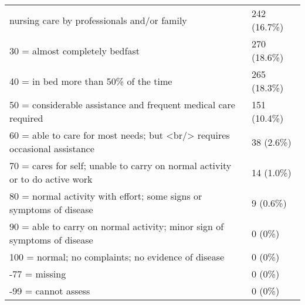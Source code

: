 \begin{tabular}[t]{ll}
\hspace{1em}nursing care by professionals and/or family & 242 (16.7\%)\\
\hspace{1em}30 = almost completely bedfast & 270 (18.6\%)\\
\hspace{1em}40 = in bed more than 50\% of the time & 265 (18.3\%)\\
50 = considerable assistance and 
\hspace{1em}frequent medical care required & 151 (10.4\%)\\
60 = able to care for most needs; but <br/> 
\hspace{1em}requires occasional assistance & 38 (2.6\%)\\
70 = cares for self; unable to carry on 
\hspace{1em}normal activity or to do active work & 14 (1.0\%)\\
80 = normal activity with effort; some 
\hspace{1em}signs or symptoms of disease & 9 (0.6\%)\\
90 = able to carry on normal activity; 
\hspace{1em}minor sign of symptoms of disease & 0 (0\%)\\
100 = normal; no complaints; 
\hspace{1em}no evidence of disease & 0 (0\%)\\
\hspace{1em}-77 = missing & 0 (0\%)\\
\hspace{1em}-99 = cannot assess & 0 (0\%)\\
\bottomrule
\end{tabular}
